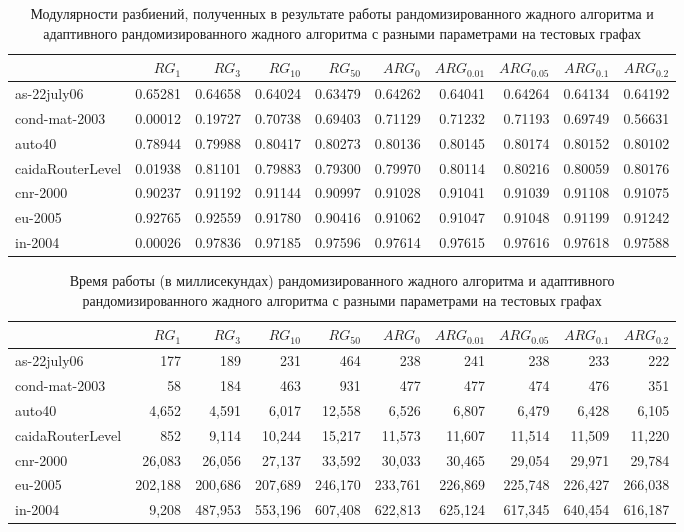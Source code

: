 \begin{table}[H]
	\caption{Модулярности разбиений, полученных в результате работы рандомизированного жадного алгоритма и адаптивного рандомизированного жадного алгоритма с разными параметрами на тестовых графах}
 	\label{tab:arg-res-q}
 	{\scriptsize
 	\begin{tabularx}{\textwidth}{Xrrrrrrrrr}\hline
 						& $RG_1$	& $RG_3$	& $RG_{10}$	& $RG_{50}$	& $ARG_0$	&$ARG_{0.01}$	&$ARG_{0.05}$	& $ARG_{0.1}$	& $ARG_{0.2}$	\\\hline
 	as-22july06			& 0.65281	& 0.64658	& 0.64024	& 0.63479	& 0.64262	& 0.64041	& 0.64264	& 0.64134	& 0.64192	\\
 	cond-mat-2003		& 0.00012	& 0.19727	& 0.70738	& 0.69403	& 0.71129	& 0.71232	& 0.71193	& 0.69749	& 0.56631	\\
 	auto40			 	& 0.78944	& 0.79988	& 0.80417	& 0.80273	& 0.80136	& 0.80145	& 0.80174	& 0.80152	& 0.80102	\\
 	caidaRouterLevel 	& 0.01938	& 0.81101	& 0.79883	& 0.79300	& 0.79970	& 0.80114	& 0.80216	& 0.80059	& 0.80176	\\
 	cnr-2000			& 0.90237	& 0.91192	& 0.91144	& 0.90997	& 0.91028	& 0.91041	& 0.91039	& 0.91108	& 0.91075	\\
 	eu-2005				& 0.92765	& 0.92559	& 0.91780	& 0.90416	& 0.91062	& 0.91047	& 0.91048	& 0.91199	& 0.91242	\\
 	in-2004				& 0.00026	& 0.97836	& 0.97185	& 0.97596	& 0.97614	& 0.97615	& 0.97616	& 0.97618	& 0.97588	\\\hline
 	\end{tabularx}
 	}
\end{table}

\begin{table}[H]
	\caption{Время работы (в миллисекундах) рандомизированного жадного алгоритма и адаптивного рандомизированного жадного алгоритма с разными параметрами на тестовых графах}
 	\label{tab:arg-res-t}
 	{\scriptsize
 	\begin{tabularx}{\textwidth}{Xrrrrrrrrr}\hline
 						& $RG_1$	& $RG_3$	& $RG_{10}$	& $RG_{50}$	& $ARG_0$	&$ARG_{0.01}$	&$ARG_{0.05}$	& $ARG_{0.1}$	& $ARG_{0.2}$	\\\hline
 	as-22july06			& 177		& 189		& 231		& 464		& 238		& 241		& 238		& 233		& 222		\\
 	cond-mat-2003		& 58		& 184		& 463		& 931		& 477		& 477		& 474		& 476		& 351		\\
 	auto40			 	& 4,652		& 4,591		& 6,017		& 12,558	& 6,526		& 6,807		& 6,479		& 6,428		& 6,105		\\
 	caidaRouterLevel 	& 852		& 9,114		& 10,244	& 15,217	& 11,573	& 11,607	& 11,514	& 11,509	& 11,220	\\
 	cnr-2000			& 26,083	& 26,056	& 27,137	& 33,592	& 30,033	& 30,465	& 29,054	& 29,971	& 29,784	\\
 	eu-2005				& 202,188	& 200,686	& 207,689	& 246,170	& 233,761	& 226,869	& 225,748	& 226,427	& 266,038	\\
 	in-2004				& 9,208		& 487,953	& 553,196	& 607,408	& 622,813	& 625,124	& 617,345	& 640,454	& 616,187	\\\hline
 	\end{tabularx}
 	}
\end{table}

